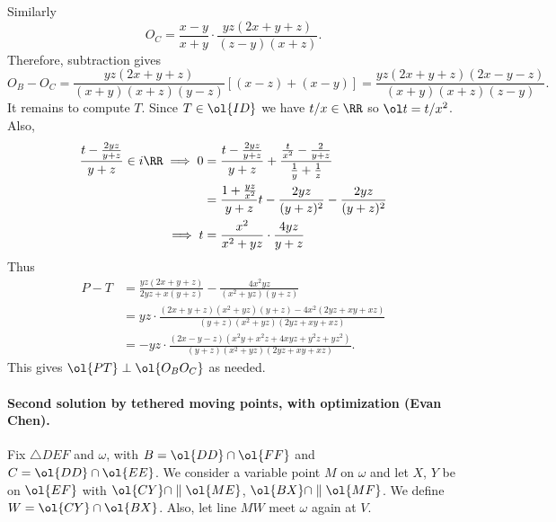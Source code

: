 \documentclass[11pt]{scrartcl}
\begin{document}
Similarly
\[ O_C = \frac{x-y}{x+y} \cdot \frac{yz(2x+y+z)}{(z-y)(x+z)}. \]
Therefore, subtraction gives
\[ O_B-O_C
  =
  \frac{yz(2x+y+z)}{(x+y)(x+z)(y-z)}
  \left[ (x-z) + (x-y) \right]
  = \frac{yz(2x+y+z)(2x-y-z)}{(x+y)(x+z)(z-y)}.
\]
It remains to compute $T$.
Since $T \in \ol{ID}$ we have $t/x \in \RR$
so $\ol t = t/x^2$.
Also,
\begin{align*}
  \frac{t - \frac{2yz}{y+z}}{y+z} \in i \RR
  \implies 0 &= \frac{t-\frac{2yz}{y+z}}{y+z}
  + \frac{\frac{t}{x^2}-\frac{2}{y+z}}{\frac1y+\frac1z} \\
  &= \frac{1+\frac{yz}{x^2}}{y+z} t - \frac{2yz}{(y+z)^2} - \frac{2yz}{(y+z)^2} \\
  \implies t &= \frac{x^2}{x^2+yz} \cdot \frac{4yz}{y+z}
\end{align*}
Thus
\begin{align*}
  P-T &= \frac{yz(2x+y+z)}{2yz+x(y+z)} - \frac{4x^2yz}{(x^2+yz)(y+z)} \\
  &= yz \cdot \frac{(2x+y+z)(x^2+yz)(y+z) - 4x^2(2yz+xy+xz)}
    {(y+z)(x^2+yz)(2yz+xy+xz)} \\
  &= -yz \cdot \frac{(2x-y-z)(x^2y+x^2z+4xyz+y^2z+yz^2)}
    {(y+z)(x^2+yz)(2yz+xy+xz)}.
\end{align*}
This gives $\ol{PT} \perp \ol{O_B O_C}$ as needed.

\paragraph{Second solution by tethered moving points, with optimization (Evan Chen).}
Fix $\triangle DEF$ and $\omega$, with $B = \ol{DD} \cap \ol{FF}$
and $C = \ol{DD} \cap \ol{EE}$.
We consider a variable point $M$ on $\omega$
and let $X$, $Y$ be on $\ol{EF}$ with
$\ol{CY} \cap \parallel \ol{ME}$, $\ol{BX} \cap \parallel \ol{MF}$.
We define $W = \ol{CY} \cap \ol{BX}$.
Also, let line $MW$ meet $\omega$ again at $V$.
\end{document}
